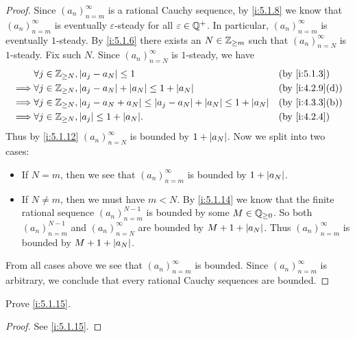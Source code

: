 \begin{proof}
  Since \((a_n)_{n = m}^{\infty}\) is a rational Cauchy sequence, by \cref{i:5.1.8} we know that \((a_n)_{n = m}^{\infty}\) is eventually \(\varepsilon\)-steady for all \(\varepsilon \in \mathbb{Q}^+\).
  In particular, \((a_n)_{n = m}^{\infty}\) is eventually \(1\)-steady.
  By \cref{i:5.1.6} there exists an \(N \in \mathbb{Z}_{\geq m}\) such that \((a_n)_{n = N}^{\infty}\) is \(1\)-steady.
  Fix such \(N\).
  Since \((a_n)_{n = N}^\infty\) is \(1\)-steady, we have
  \begin{align*}
             & \forall j \in \Z_{\geq N}, \abs{a_j - a_N} \leq 1                                                    &  & \by{i:5.1.3}    \\
    \implies & \forall j \in \Z_{\geq N}, \abs{a_j - a_N} + \abs{a_N} \leq 1 + \abs{a_N}                            &  & \by{i:4.2.9}[d] \\
    \implies & \forall j \in \Z_{\geq N}, \abs{a_j - a_N + a_N} \leq \abs{a_j - a_N} + \abs{a_N} \leq 1 + \abs{a_N} &  & \by{i:4.3.3}[b] \\
    \implies & \forall j \in \Z_{\geq N}, \abs{a_j} \leq 1 + \abs{a_N}.                                             &  & \by{i:4.2.4}
  \end{align*}
  Thus by \cref{i:5.1.12} \((a_n)_{n = N}^\infty\) is bounded by \(1 + \left\lvert a_N\right\rvert\).
  Now we split into two cases:
  \begin{itemize}
    \item If \(N = m\), then we see that \((a_n)_{n = m}^\infty\) is bounded by \(1 + \left\lvert a_N\right\rvert\).
    \item If \(N \neq m\), then we must have \(m < N\).
          By \cref{i:5.1.14} we know that the finite rational sequence \((a_n)_{n = m}^{N - 1}\) is bounded by some \(M \in \mathbb{Q}_{\geq 0}\).
          So both \((a_n)_{n = m}^{N - 1}\) and \((a_n)_{n = N}^\infty\) are bounded by \(M + 1 + \left\lvert a_N\right\rvert\).
          Thus \((a_n)_{n = m}^\infty\) is bounded by \(M + 1 + \left\lvert a_N\right\rvert\).
  \end{itemize}
  From all cases above we see that \((a_n)_{n = m}^\infty\) is bounded.
  Since \((a_n)_{n = m}^\infty\) is arbitrary, we conclude that every rational Cauchy sequences are bounded.
\end{proof}

\exercisesection

\begin{ex}\label{i:ex:5.1.1}
  Prove \cref{i:5.1.15}.
\end{ex}

\begin{proof}
  See \cref{i:5.1.15}.
\end{proof}
